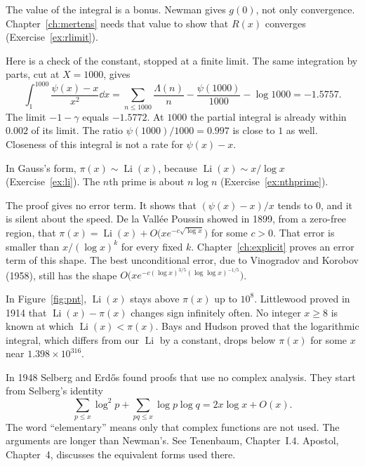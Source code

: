 The value of the integral is a bonus. Newman gives $g(0)$, not only convergence. Chapter~\ref{ch:mertens} needs that value to show that $R(x)$ converges (Exercise~\ref{ex:rlimit}).

Here is a check of the constant, stopped at a finite limit. The same integration by parts, cut at $X=1000$, gives
\[
\int_1^{1000}\frac{\psi(x)-x}{x^2}\dd x=\sum_{n\le1000}\frac{\Lambda(n)}n-\frac{\psi(1000)}{1000}-\log 1000=-1.5757.
\]
The limit $-1-\gamma$ equals $-1.5772$. At $1000$ the partial integral is already within $0.002$ of its limit. The ratio $\psi(1000)/1000=0.997$ is close to $1$ as well. Closeness of this integral is not a rate for $\psi(x)-x$.

In Gauss's form, $\pi(x)\sim\operatorname{Li}(x)$, because $\operatorname{Li}(x)\sim x/\log x$ (Exercise~\ref{ex:li}). The $n$th prime is about $n\log n$ (Exercise~\ref{ex:nthprime}).

\begin{remark}
The proof gives no error term. It shows that $(\psi(x)-x)/x$ tends to $0$, and it is silent about the speed. De la Vallée Poussin showed in 1899, from a zero-free region, that $\pi(x)=\operatorname{Li}(x)+O\bigl(xe^{-c\sqrt{\log x}}\bigr)$ for some $c>0$. That error is smaller than $x/(\log x)^k$ for every fixed $k$. Chapter~\ref{ch:explicit} proves an error term of this shape. The best unconditional error, due to Vinogradov and Korobov (1958), still has the shape $O\bigl(xe^{-c(\log x)^{3/5}(\log\log x)^{-1/5}}\bigr)$.

In Figure~\ref{fig:pnt}, $\operatorname{Li}(x)$ stays above $\pi(x)$ up to $10^8$. Littlewood proved in 1914 that $\operatorname{Li}(x)-\pi(x)$ changes sign infinitely often. No integer $x\ge 8$ is known at which $\operatorname{Li}(x)<\pi(x)$. Bays and Hudson proved that the logarithmic integral, which differs from our $\operatorname{Li}$ by a constant, drops below $\pi(x)$ for some $x$ near $1.398\times10^{316}$.
\end{remark}

\begin{remark}
In 1948 Selberg and Erdős found proofs that use no complex analysis. They start from Selberg's identity
\[
\sum_{p\le x}\log^2p+\sum_{pq\le x}\log p\log q=2x\log x+O(x).
\]
The word ``elementary'' means only that complex functions are not used. The arguments are longer than Newman's. See Tenenbaum, Chapter~I.4. Apostol, Chapter~4, discusses the equivalent forms used there.
\end{remark}

